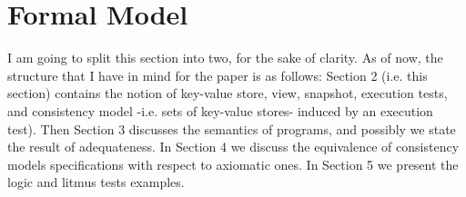 \section{Formal Model}
\label{sec:model}

\ac{I am going to split this section into two, for the sake of clarity. 
As of now, the structure that I have in mind for the paper is as follows: 
Section 2 (i.e. this section) contains the notion of key-value store, view, snapshot, 
execution tests, and consistency model  -i.e. sets of key-value stores- 
induced by an execution test). Then Section 3 discusses 
the semantics of programs, and possibly we state the result 
of adequateness. In Section 4 we discuss the equivalence of consistency 
models specifications with respect to axiomatic ones. In Section 5 
we present the logic and litmus tests examples.}





